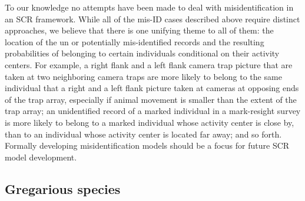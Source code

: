 To our knowledge no attempts have been made to deal with
misidentification in an SCR framework. While all of the mis-ID cases
described above require distinct approaches, we believe that there is
one unifying theme to all of them: the location of the un or
potentially mis-identified records and the resulting probabilities of
belonging to certain individuals conditional on their activity
centers. For example, a right flank and a left flank camera trap
picture that are taken at two neighboring camera traps are more likely
to belong to the same individual that a right and a left flank picture
taken at cameras at opposing ends of the trap array, especially if
animal movement is smaller than the extent of the trap array; an
unidentified record of a marked individual in a mark-resight survey is
more likely to belong to a marked individual whose activity center is
close by, than to an individual whose activity center is located far
away; and so forth. Formally developing misidentification models
should be a focus for future SCR model development.

\subsection{Gregarious species}

